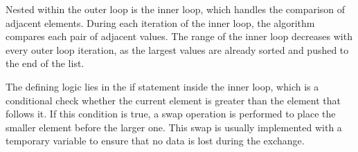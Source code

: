 Nested within the outer loop is the inner loop, which handles the comparison of adjacent elements. During each iteration of the inner loop, the algorithm compares each pair of adjacent values. The range of the inner loop decreases with every outer loop iteration, as the largest values are already sorted and pushed to the end of the list.

The defining logic lies in the if statement inside the inner loop, which is a conditional check whether the current element is greater than the element that follows it. If this condition is true, a swap operation is performed to place the smaller element before the larger one. This swap is usually implemented with a temporary variable to ensure that no data is lost during the exchange.
